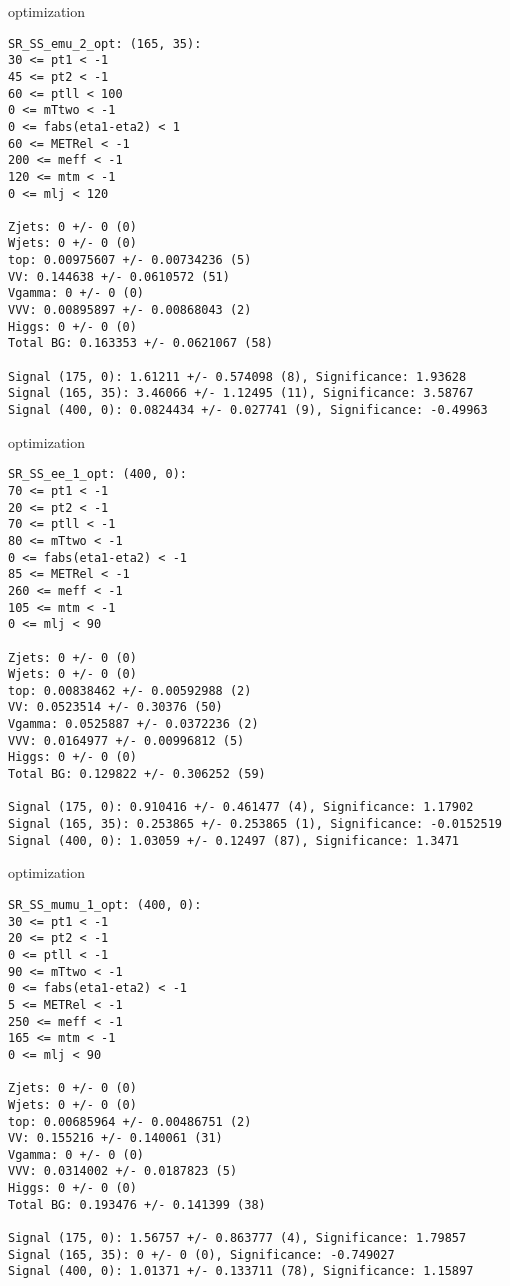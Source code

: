 \begin{frame}[fragile]{optimization}
\tiny
\begin{verbatim}
SR_SS_emu_2_opt: (165, 35):
30 <= pt1 < -1
45 <= pt2 < -1
60 <= ptll < 100
0 <= mTtwo < -1
0 <= fabs(eta1-eta2) < 1
60 <= METRel < -1
200 <= meff < -1
120 <= mtm < -1
0 <= mlj < 120

Zjets: 0 +/- 0 (0)
Wjets: 0 +/- 0 (0)
top: 0.00975607 +/- 0.00734236 (5)
VV: 0.144638 +/- 0.0610572 (51)
Vgamma: 0 +/- 0 (0)
VVV: 0.00895897 +/- 0.00868043 (2)
Higgs: 0 +/- 0 (0)
Total BG: 0.163353 +/- 0.0621067 (58)

Signal (175, 0): 1.61211 +/- 0.574098 (8), Significance: 1.93628
Signal (165, 35): 3.46066 +/- 1.12495 (11), Significance: 3.58767
Signal (400, 0): 0.0824434 +/- 0.027741 (9), Significance: -0.49963

\end{verbatim}
\end{frame}

\begin{frame}[fragile]{optimization}
\tiny
\begin{verbatim}
SR_SS_ee_1_opt: (400, 0):
70 <= pt1 < -1
20 <= pt2 < -1
70 <= ptll < -1
80 <= mTtwo < -1
0 <= fabs(eta1-eta2) < -1
85 <= METRel < -1
260 <= meff < -1
105 <= mtm < -1
0 <= mlj < 90

Zjets: 0 +/- 0 (0)
Wjets: 0 +/- 0 (0)
top: 0.00838462 +/- 0.00592988 (2)
VV: 0.0523514 +/- 0.30376 (50)
Vgamma: 0.0525887 +/- 0.0372236 (2)
VVV: 0.0164977 +/- 0.00996812 (5)
Higgs: 0 +/- 0 (0)
Total BG: 0.129822 +/- 0.306252 (59)

Signal (175, 0): 0.910416 +/- 0.461477 (4), Significance: 1.17902
Signal (165, 35): 0.253865 +/- 0.253865 (1), Significance: -0.0152519
Signal (400, 0): 1.03059 +/- 0.12497 (87), Significance: 1.3471
\end{verbatim}
\end{frame}

\begin{frame}[fragile]{optimization}
\tiny
\begin{verbatim}
SR_SS_mumu_1_opt: (400, 0):
30 <= pt1 < -1
20 <= pt2 < -1
0 <= ptll < -1
90 <= mTtwo < -1
0 <= fabs(eta1-eta2) < -1
5 <= METRel < -1
250 <= meff < -1
165 <= mtm < -1
0 <= mlj < 90

Zjets: 0 +/- 0 (0)
Wjets: 0 +/- 0 (0)
top: 0.00685964 +/- 0.00486751 (2)
VV: 0.155216 +/- 0.140061 (31)
Vgamma: 0 +/- 0 (0)
VVV: 0.0314002 +/- 0.0187823 (5)
Higgs: 0 +/- 0 (0)
Total BG: 0.193476 +/- 0.141399 (38)

Signal (175, 0): 1.56757 +/- 0.863777 (4), Significance: 1.79857
Signal (165, 35): 0 +/- 0 (0), Significance: -0.749027
Signal (400, 0): 1.01371 +/- 0.133711 (78), Significance: 1.15897
\end{verbatim}
\end{frame}

